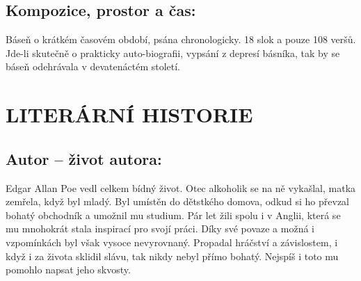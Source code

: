 \documentclass{extarticle} %
\begin{document}
\subsection*{Kompozice, prostor a čas:}
\noindent 
Báseň o krátkém časovém období, psána chronologicky. 18 slok a pouze 108 veršů. Jde-li skutečně o prakticky auto-biografii, vypsání z depresí básníka, tak by se báseň odehrávala v devatenáctém století.


\section*{LITERÁRNÍ HISTORIE}





\subsection*{Autor {\ssmall -- život autora:}}
\noindent 
Edgar Allan Poe vedl celkem bídný život. Otec alkoholik se na ně vykašlal, matka zemřela, když byl mladý. Byl umístěn do dětstkého domova, odkud si ho převzal bohatý obchodník a umožnil mu studium. Pár let žili spolu i v Anglii, která se mu mnohokrát stala inspirací pro svojí práci. Díky své povaze a možná i vzpomínkách byl však vysoce nevyrovnaný. Propadal hráčství a závislostem, i když i za života sklidil slávu, tak nikdy nebyl přímo bohatý. Nejspíš i toto mu pomohlo napsat jeho skvosty.
\end{document}
